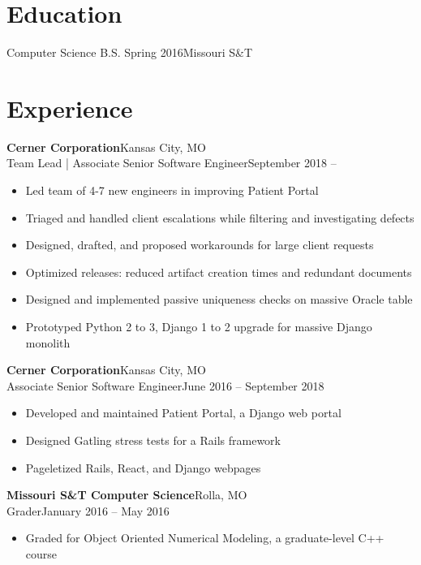\documentclass[margin]{res}
\begin{document}
  \begin{resume}
    \section{Education}
      Computer Science B.S. Spring 2016\hfill Missouri S\&T\\
    \section{Experience}
       \textbf{Cerner Corporation}\hfill Kansas City, MO\\
         Team Lead | Associate Senior Software Engineer\hfill September 2018 --
         \begin{itemize} \itemsep -1pt  %
            \item Led team of 4-7 new engineers in improving Patient Portal
            \item Triaged and handled client escalations while filtering and investigating defects
            \item Designed, drafted, and proposed workarounds for large client requests
            \item Optimized releases: reduced artifact creation times and redundant documents
            \item Designed and implemented passive uniqueness checks on massive Oracle table
            \item Prototyped Python 2 to 3, Django 1 to 2 upgrade for massive Django monolith
         \end{itemize}

       \textbf{Cerner Corporation}\hfill Kansas City, MO\\
         Associate Senior Software Engineer\hfill June 2016 -- September 2018
         \begin{itemize} \itemsep -1pt  %
            \item Developed and maintained Patient Portal, a Django web portal
            \item Designed Gatling stress tests for a Rails framework
            \item Pageletized Rails, React, and Django webpages
         \end{itemize}

      \textbf{Missouri S\&T Computer Science}\hfill Rolla, MO\\
         Grader\hfill January 2016 -- May 2016
         \begin{itemize} \itemsep -1pt  %
           \item Graded for Object Oriented Numerical Modeling, a graduate-level C++ course
         \end{itemize}


\end{resume}
\end{document}
